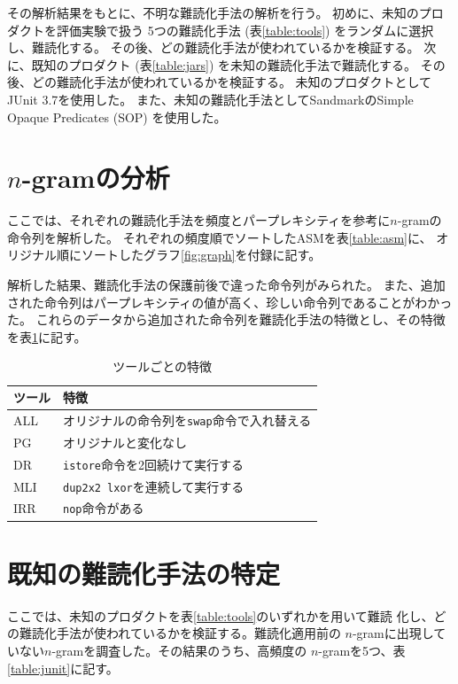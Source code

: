 \documentclass[12pt,twoside]{jbook}
\begin{document}
その解析結果をもとに、不明な難読化手法の解析を行う。
初めに、未知のプロダクトを評価実験で扱う
5つの難読化手法 (表\ref{table:tools}) をランダムに選択し、難読化する。
その後、どの難読化手法が使われているかを検証する。
次に、既知のプロダクト (表\ref{table:jars}) を未知の難読化手法で難読化する。
その後、どの難読化手法が使われているかを検証する。
未知のプロダクトとしてJUnit 3.7を使用した。
また、未知の難読化手法としてSandmarkのSimple Opaque Predicates (SOP) を使用した。

\section{$n$-gramの分析}

ここでは、それぞれの難読化手法を頻度とパープレキシティを参考に$n$-gramの命令列を解析した。
それぞれの頻度順でソートしたASMを表\ref{table:asm}に、
オリジナル順にソートしたグラフ\ref{fig:graph}を付録に記す。

解析した結果、難読化手法の保護前後で違った命令列がみられた。
また、追加された命令列はパープレキシティの値が高く、珍しい命令列であることがわかった。
これらのデータから追加された命令列を難読化手法の特徴とし、その特徴を表\ref{table:features}に記す。

\begin{table}[t]
  \centering
  \footnotesize{
    \caption{ツールごとの特徴}\label{table:features}
  \begin{tabular}{l|l}
    ツール              & 特徴　\\ \hline
    ALL & オリジナルの命令列を\texttt{swap}命令で入れ替える \\
    PG  & オリジナルと変化なし \\
    DR  & \texttt{istore}命令を2回続けて実行する \\
    MLI & \texttt{dup2x2 lxor}を連続して実行する \\
    IRR & \texttt{nop}命令がある \\
  \end{tabular}}
\end{table}

\section{既知の難読化手法の特定}

ここでは、未知のプロダクトを表\ref{table:tools}のいずれかを用いて難読
化し、どの難読化手法が使われているかを検証する。難読化適用前の
$n$-gramに出現していない$n$-gramを調査した。その結果のうち、高頻度の
$n$-gramを5つ、表\ref{table:junit}に記す。
\end{document}
